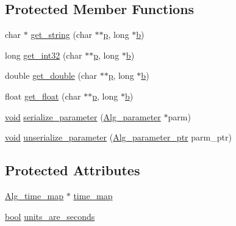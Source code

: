 \subsection*{Protected Member Functions}
\begin{DoxyCompactItemize}
\item 
char $\ast$ \hyperlink{class_alg__track_ab0a5b7aa7c6df3e0a653ec025550d9f3}{get\+\_\+string} (char $\ast$$\ast$\hyperlink{xmltok_8h_a94b60f3beb36ae85555d36dc9816769c}{p}, long $\ast$\hyperlink{convtest_8m_a21ad0bd836b90d08f4cf640b4c298e7c}{b})
\item 
long \hyperlink{class_alg__track_a3f7cedee9c90ffc497d101dbd3d723a3}{get\+\_\+int32} (char $\ast$$\ast$\hyperlink{xmltok_8h_a94b60f3beb36ae85555d36dc9816769c}{p}, long $\ast$\hyperlink{convtest_8m_a21ad0bd836b90d08f4cf640b4c298e7c}{b})
\item 
double \hyperlink{class_alg__track_a13bd6063835cdfa854b2e10bc14e0776}{get\+\_\+double} (char $\ast$$\ast$\hyperlink{xmltok_8h_a94b60f3beb36ae85555d36dc9816769c}{p}, long $\ast$\hyperlink{convtest_8m_a21ad0bd836b90d08f4cf640b4c298e7c}{b})
\item 
float \hyperlink{class_alg__track_ac407aab166a38e278237e5c7adadcd1f}{get\+\_\+float} (char $\ast$$\ast$\hyperlink{xmltok_8h_a94b60f3beb36ae85555d36dc9816769c}{p}, long $\ast$\hyperlink{convtest_8m_a21ad0bd836b90d08f4cf640b4c298e7c}{b})
\item 
\hyperlink{sound_8c_ae35f5844602719cf66324f4de2a658b3}{void} \hyperlink{class_alg__track_a0f6805257dc60708271e92cd62759b53}{serialize\+\_\+parameter} (\hyperlink{class_alg__parameter}{Alg\+\_\+parameter} $\ast$parm)
\item 
\hyperlink{sound_8c_ae35f5844602719cf66324f4de2a658b3}{void} \hyperlink{class_alg__track_a813f3f100c1cdec8a1402f590371eaf4}{unserialize\+\_\+parameter} (\hyperlink{allegro_8h_a11b6679f8e1fe576476b10e4bc1f7240}{Alg\+\_\+parameter\+\_\+ptr} parm\+\_\+ptr)
\end{DoxyCompactItemize}
\subsection*{Protected Attributes}
\begin{DoxyCompactItemize}
\item 
\hyperlink{class_alg__time__map}{Alg\+\_\+time\+\_\+map} $\ast$ \hyperlink{class_alg__track_ad9c8b779f82b1a4cac9e5ac34919197f}{time\+\_\+map}
\item 
\hyperlink{mac_2config_2i386_2lib-src_2libsoxr_2soxr-config_8h_abb452686968e48b67397da5f97445f5b}{bool} \hyperlink{class_alg__track_a0e6a77b346f4e48af674cd9a647f9e7f}{units\+\_\+are\+\_\+seconds}
\end{DoxyCompactItemize}
